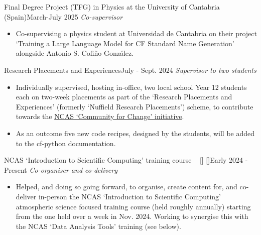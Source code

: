 
\begin{projects}

\projecta
	{Final Degree Project (TFG) in Physics at the University of Cantabria (Spain)}{March-July 2025}
	{
	    \textit{Co-supervisor}
	}
	{\begin{itemize}
     \item Co-supervising a physics student at Universidad de Cantabria on their project `Training a Large Language Model for CF Standard Name Generation' alongside Antonio S. Cofi\~{n}o Gonz\'{a}lez.
     \end{itemize}}

\projecta
	{Research Placements and Experiences}{July - Sept. 2024}
	{
	    \textit{Supervisor to two students}
	}
	{\begin{itemize}
     \item Individually supervised, hosting in-office, two local school Year 12 students each on two-week placements as part of the `Research Placements and Experiences' (formerly `Nuffield Research Placements') scheme, to contribute towards the \href{https://ncas.ac.uk/for-staff/change/}{NCAS `Community for Change' initiative}.
     \item As an outcome five new code recipes, designed by the students, will be added to the cf-python documentation.
     \end{itemize}}

\projecta
	{NCAS `Introduction to Scientific Computing' training course ~ [\href{https://ncas.ac.uk/study-with-us/introduction-to-scientific-computing/}{\small{\websiteSymbol}}] [\href{https://github.com/ncasuk/ncas-isc}{\small{\githubSymbol}}]}{Early 2024 - Present}
	{
	    \textit{Co-organiser and co-delivery}
	}
	{\begin{itemize}
     \item Helped, and doing so going forward, to organise, create content for, and co-deliver in-person the NCAS `Introduction to Scientific Computing' atmospheric science focused training course (held roughly annually) starting from the one held over a week in Nov. 2024. Working to synergise this with the NCAS `Data Analysis Tools’ training (see below).
     \end{itemize}}

\end{projects}
